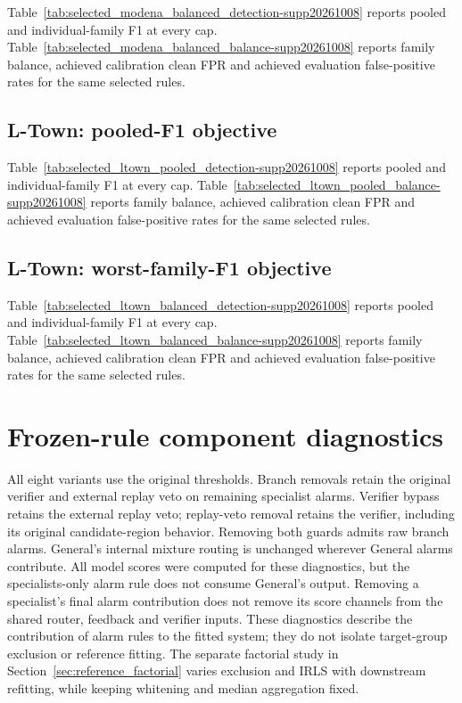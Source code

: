 Table~\ref{tab:selected_modena_balanced_detection-supp20261008} reports pooled and individual-family F1 at every cap. Table~\ref{tab:selected_modena_balanced_balance-supp20261008} reports family balance, achieved calibration clean FPR and achieved evaluation false-positive rates for the same selected rules.





\subsection{L-Town: pooled-F1 objective}

Table~\ref{tab:selected_ltown_pooled_detection-supp20261008} reports pooled and individual-family F1 at every cap. Table~\ref{tab:selected_ltown_pooled_balance-supp20261008} reports family balance, achieved calibration clean FPR and achieved evaluation false-positive rates for the same selected rules.





\subsection{L-Town: worst-family-F1 objective}

Table~\ref{tab:selected_ltown_balanced_detection-supp20261008} reports pooled and individual-family F1 at every cap. Table~\ref{tab:selected_ltown_balanced_balance-supp20261008} reports family balance, achieved calibration clean FPR and achieved evaluation false-positive rates for the same selected rules.





\section{Frozen-rule component diagnostics}

All eight variants use the original thresholds. Branch removals retain the original verifier and external replay veto on remaining specialist alarms. Verifier bypass retains the external replay veto; replay-veto removal retains the verifier, including its original candidate-region behavior. Removing both guards admits raw branch alarms. General's internal mixture routing is unchanged wherever General alarms contribute. All model scores were computed for these diagnostics, but the specialists-only alarm rule does not consume General's output. Removing a specialist's final alarm contribution does not remove its score channels from the shared router, feedback and verifier inputs. These diagnostics describe the contribution of alarm rules to the fitted system; they do not isolate target-group exclusion or reference fitting. The separate factorial study in Section~\ref{sec:reference_factorial} varies exclusion and IRLS with downstream refitting, while keeping whitening and median aggregation fixed.

